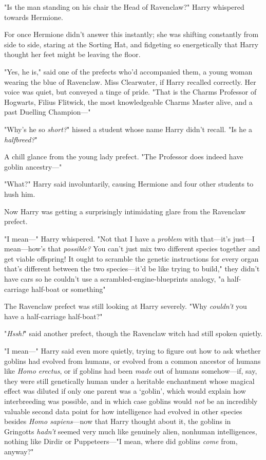"Is the man standing on his chair the Head of Ravenclaw?" Harry whispered
towards Hermione.

For once Hermione didn't answer this instantly; she was shifting constantly
from side to side, staring at the Sorting Hat, and fidgeting so energetically
that Harry thought her feet might be leaving the floor.

"Yes, he is," said one of the prefects who'd accompanied them, a young woman
wearing the blue of Ravenclaw. Miss Clearwater, if Harry recalled correctly.
Her voice was quiet, but conveyed a tinge of pride. "That is the Charms
Professor of Hogwarts, Filius Flitwick, the most knowledgeable Charms Master
alive, and a past Duelling Champion\mbox{---}"

"Why's he so \emph{short?}" hissed a student whose name Harry didn't recall.
"Is he a \emph{halfbreed?}"

A chill glance from the young lady prefect. "The Professor does indeed have
goblin ancestry\mbox{---}"

"What?" Harry said involuntarily, causing Hermione and four other students to
hush him.

Now Harry was getting a surprisingly intimidating glare from the Ravenclaw
prefect.

"I mean\mbox{---}" Harry whispered. "Not that I have a \emph{problem} with that---it's
just---I mean---how's that \emph{possible?} You can't just mix two different
species together and get viable offspring! It ought to scramble the genetic
instructions for every organ that's different between the two species---it'd be
like trying to build," they didn't have cars so he couldn't use a
scrambled-engine-blueprints analogy, "a half-carriage half-boat or
something{\el}"

The Ravenclaw prefect was still looking at Harry severely. "Why \emph{couldn't}
you have a half-carriage half-boat?"

"\emph{Hssh!}" said another prefect, though the Ravenclaw witch had still
spoken quietly.

"I mean\mbox{---}" Harry said even more quietly, trying to figure out how to ask
whether goblins had evolved from humans, or evolved from a common ancestor of
humans like \emph{Homo erectus}, or if goblins had been \emph{made} out of
humans somehow---if, say, they were still genetically human under a heritable
enchantment whose magical effect was diluted if only one parent was a `goblin',
which would explain how interbreeding was possible, and in which case goblins
would \emph{not} be an incredibly valuable second data point for how
intelligence had evolved in other species besides \emph{Homo sapiens}---now
that Harry thought about it, the goblins in Gringotts \emph{hadn't} seemed very
much like genuinely alien, nonhuman intelligences, nothing like Dirdir or
Puppeteers\mbox{---}"I mean, where did goblins \emph{come} from, anyway?"

